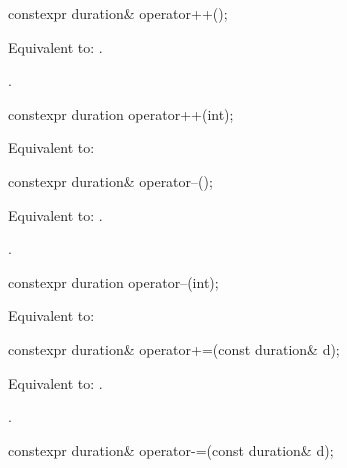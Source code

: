 %
\begin{itemdecl}
constexpr duration& operator++();
\end{itemdecl}

\begin{itemdescr}
\pnum
\effects
Equivalent to: .

\pnum
\returns
{}.
\end{itemdescr}

%
\begin{itemdecl}
constexpr duration operator++(int);
\end{itemdecl}

\begin{itemdescr}
\pnum
\effects
Equivalent to: 
\end{itemdescr}

%
\begin{itemdecl}
constexpr duration& operator--();
\end{itemdecl}

\begin{itemdescr}
\pnum
\effects
Equivalent to: .

\pnum
\returns
{}.
\end{itemdescr}

%
\begin{itemdecl}
constexpr duration operator--(int);
\end{itemdecl}

\begin{itemdescr}
\pnum
\effects
Equivalent to: 
\end{itemdescr}

%
\begin{itemdecl}
constexpr duration& operator+=(const duration& d);
\end{itemdecl}

\begin{itemdescr}
\pnum
\effects
Equivalent to: .

\pnum
\returns
{}.
\end{itemdescr}

%
\begin{itemdecl}
constexpr duration& operator-=(const duration& d);
\end{itemdecl}

